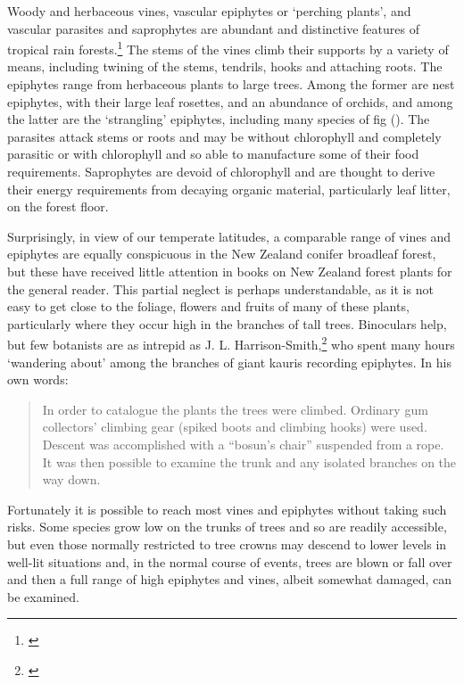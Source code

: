 Woody and herbaceous vines, vascular epiphytes or `perching plants', and vascular parasites and saprophytes are abundant and distinctive features of tropical rain forests.\footnote{\cite{richards1952tropical}}
The stems of the vines climb their supports by a variety of means, including twining of the stems, tendrils, hooks and attaching roots.
The epiphytes range from herbaceous plants to large trees.
Among the former are nest epiphytes, with their large leaf rosettes, and an abundance of orchids, and among the latter are the `strangling' epiphytes, including many species of fig ().
The parasites attack stems or roots and may be without chlorophyll and completely parasitic or with chlorophyll and so able to manufacture some of their food requirements.
Saprophytes are devoid of chlorophyll and are thought to derive their energy requirements from decaying organic material, particularly leaf litter, on the forest floor.

Surprisingly, in view of our temperate latitudes, a comparable range of vines and epiphytes are equally conspicuous in the New Zealand conifer broadleaf forest, but these have received little attention in books on New Zealand forest plants for the general reader.
This partial neglect is perhaps understandable, as it is not easy to get close to the foliage, flowers and fruits of many of these plants, particularly where they occur high in the branches of tall trees.
Binoculars help, but few botanists are as intrepid as J. L. Harrison-Smith,\footnote{\cite{harrisonsmith1938kauri}} who spent many hours `wandering about' among the branches of giant kauris recording epiphytes.
In his own words:

\begin{quote}
	In order to catalogue the plants the trees were climbed.
	Ordinary gum collectors' climbing gear (spiked boots and climbing hooks) were used.
	Descent was accomplished with a ``bosun's chair'' suspended from a rope.
	It was then possible to examine the trunk and any isolated branches on the way down.
\end{quote}

Fortunately it is possible to reach most vines and epiphytes without taking such risks.
Some species grow low on the trunks of trees and so are readily accessible, but even those normally restricted to tree crowns may descend to lower levels in well-lit situations and, in the normal course of events, trees are blown or fall over and then a full range of high epiphytes and vines, albeit somewhat damaged, can be examined.


